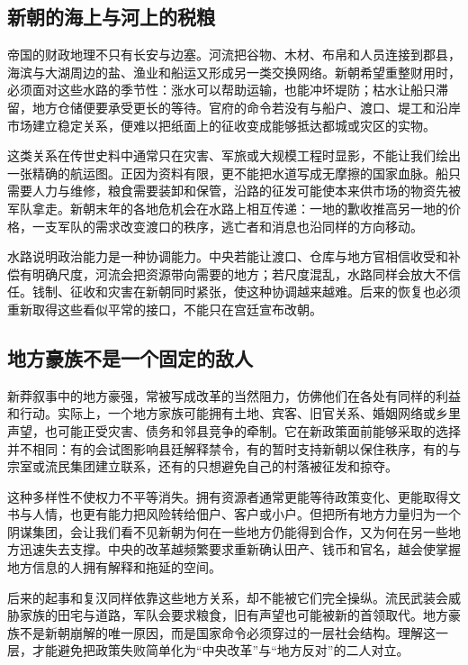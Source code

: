 \subsection{新朝的海上与河上的税粮}

帝国的财政地理不只有长安与边塞。河流把谷物、木材、布帛和人员连接到郡县，海滨与大湖周边的盐、渔业和船运又形成另一类交换网络。新朝希望重整财用时，必须面对这些水路的季节性：涨水可以帮助运输，也能冲坏堤防；枯水让船只滞留，地方仓储便要承受更长的等待。官府的命令若没有与船户、渡口、堤工和沿岸市场建立稳定关系，便难以把纸面上的征收变成能够抵达都城或灾区的实物。

这类关系在传世史料中通常只在灾害、军旅或大规模工程时显影，不能让我们绘出一张精确的航运图。正因为资料有限，更不能把水道写成无摩擦的国家血脉。船只需要人力与维修，粮食需要装卸和保管，沿路的征发可能使本来供市场的物资先被军队拿走。新朝末年的各地危机会在水路上相互传递：一地的歉收推高另一地的价格，一支军队的需求改变渡口的秩序，逃亡者和消息也沿同样的方向移动。

水路说明政治能力是一种协调能力。中央若能让渡口、仓库与地方官相信收受和补偿有明确尺度，河流会把资源带向需要的地方；若尺度混乱，水路同样会放大不信任。钱制、征收和灾害在新朝同时紧张，使这种协调越来越难。后来的恢复也必须重新取得这些看似平常的接口，不能只在宫廷宣布改朝。

\subsection{地方豪族不是一个固定的敌人}

新莽叙事中的地方豪强，常被写成改革的当然阻力，仿佛他们在各处有同样的利益和行动。实际上，一个地方家族可能拥有土地、宾客、旧官关系、婚姻网络或乡里声望，也可能正受灾害、债务和邻县竞争的牵制。它在新政策面前能够采取的选择并不相同：有的会试图影响县廷解释禁令，有的暂时支持新朝以保住秩序，有的与宗室或流民集团建立联系，还有的只想避免自己的村落被征发和掠夺。

这种多样性不使权力不平等消失。拥有资源者通常更能等待政策变化、更能取得文书与人情，也更有能力把风险转给佃户、客户或小户。但把所有地方力量归为一个阴谋集团，会让我们看不见新朝为何在一些地方仍能得到合作，又为何在另一些地方迅速失去支撑。中央的改革越频繁要求重新确认田产、钱币和官名，越会使掌握地方信息的人拥有解释和拖延的空间。

后来的起事和复汉同样依靠这些地方关系，却不能被它们完全操纵。流民武装会威胁家族的田宅与道路，军队会要求粮食，旧有声望也可能被新的首领取代。地方豪族不是新朝崩解的唯一原因，而是国家命令必须穿过的一层社会结构。理解这一层，才能避免把政策失败简单化为“中央改革”与“地方反对”的二人对立。

